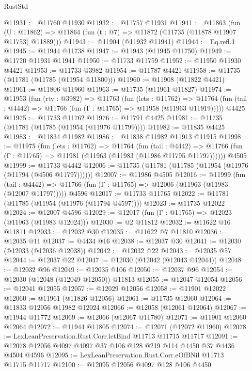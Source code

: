 \begin{lexlean}{RustStd}
\begin{coremodule}
{\begin{coremodule}
{{{{{{{{{{{{{{{{{{{{{{{{{{{{{{{{{{{{{{{{{{{{{{{{{{{{{{{{{{{{{{{{{{{{@11931 := @11760 @11930
@11932 := @11757 @11931
@11941 := @11863
    (fun (U : @11862) => @11864 (fun (t : @7) => @11872 (@11735 (@11878 @11907 @11753) @11889)))
@11943 := @11904 (@11932 @11941)
@11944 := Eq.refl.{1}
@11945 := @11944 @11738
@11947 := @11943 (@11945 @11750)
@11949 := @11720 @11931 @11941
@11950 := @11733 @11759
@11952 := @11950 @11930 @4421
@11953 := @11733 @3982
@11954 := @11787 @4421
@11958 := @11735 (@11781 (@11785 (@11954 @11800)))
@11960 := @11908 (@11822 @4421)
@11961 := @11806 @11960
@11963 := @11735 (@11961 @11827)
@11974 := @11953
    (fun (rty : @3982) =>
    @11763
      (fun (lets : @11762) =>
      @11764 (fun (tail : @4442) => @11766 (fun (Γ : @11765) => @11958 (@11963 @11919)))))
    @4425
@11975 := @11733 @11762
@11976 := @11791 @4425
@11981 := @11735 (@11781 (@11785 (@11954 (@11976 @11799))))
@11982 := @11835 @4425
@11983 := @11834 @11982
@11986 := @11838 @11982 @11913 @11915
@11998 := @11975
    (fun (lets : @11762) =>
    @11764
      (fun (tail : @4442) =>
      @11766 (fun (Γ : @11765) => @11981 (@11963 (@11983 (@11986 @11795 @11797))))))
    @4505
@11999 := @11733 @4442
@12006 := @11735 (@11781 (@11785 (@11954 (@11976 (@11794 (@4506 @11797))))))
@12007 := @11986 @4505
@12016 := @11999
    (fun (tail : @4442) => @11766 (fun (Γ : @11765) => @12006 (@11963 (@11983 (@12007 @11797)))))
    @4596
@12017 := @11733 @11765
@12022 := @11781 (@11785 (@11954 (@11976 (@11794 @4597))))
@12023 := @11735 @12022
@12024 := @12007 @4596
@12029 := @12017 (fun (Γ : @11765) => @12023 (@11963 (@11983 @12024)))
@12030 := @2 @11812
@12032 := @11622 @16 @11811
@12033 := @12032 @30
@12035 := @11622 @7 @11810
@12036 := @12035 @11
@12037 := @4434 @16
@12038 := @12037 @30
@12041 := @12030 (@12033 (@12036 @12038))
@12042 := @12032 @22
@12043 := @12035 @57
@12044 := @12037 @22
@12047 := @12030 (@12042 (@12043 @12044))
@12048 := @12032 @96
@12049 := @12035 @106
@12050 := @12037 @96
@12054 := @12030 (@12048 (@12049 @12050)) @11813
@12055 := @12047 @12054
@12056 := @12041 @12055
@12057 := @12029 @12056
@12058 := @11901 @12022
@12060 := @11961 (@11826 @12056)
@12061 := @11735 @12060
@12064 := @11833 @12056 @11982 @12024
@12066 := @12058 (@12061 @12064)
@12067 := @11944 @11772
@12069 := @12066 (@12067 @11780)
@12071 := @11901 @12060 @12064
@12072 := @11944 @11805
@12074 := @12071 (@12072 @11960)
@12078 := LexLeanPreservation.Rust.Corr.letBind @11713 @11715 @11717
@12091 := @12078 @12056 @4097 @4097 @37 @106 @128 @219 @114 @4450 @37 @4436 @4504 @4596
@12095 := LexLeanPreservation.Rust.Corr.eOfBNil @11713 @11715 @11717
@12100 := @12095 @12056 @4097 @128 @106 @4450
}}}}}}}}}}}}}}}}}}}}}}}}}}}}}}}}}}}}}}}}}}}}}}}}}}}}}}}}}}}}}}}}}}}}
\end{coremodule}}
\end{coremodule}
\end{lexlean}
